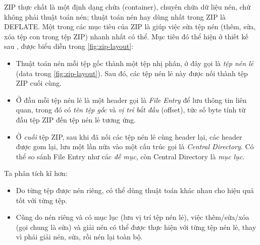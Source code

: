 \documentclass[../../thesis]{subfiles}
\begin{document}
ZIP thực chất là một định dạng chứa (container), chuyên chứa dữ liệu nén, chứ
không phải thuật toán nén; thuật toán nén hay dùng nhất trong ZIP là DEFLATE.
Một trong các mục tiêu của ZIP là giúp việc sửa tệp nén (thêm, sửa, xóa tệp con
trong tệp ZIP) nhanh nhất có thể. Mục tiêu đó thể hiện ở thiết kế sau
\cite{PKWARE_APPNOTE}, được biểu diễn trong \autoref{fig:zip-layout}:

\begin{itemize}
    \item
        Thuật toán nén mỗi tệp gốc thành một tệp nhị phân, ở đây gọi là
        \emph{tệp nén lẻ} (data trong \autoref{fig:zip-layout}). Sau đó, các tệp
        nén lẻ này được nối thành tệp ZIP cuối cùng.
    \item
        Ở đầu mỗi tệp nén lẻ là một header gọi là \emph{File Entry} để lưu thông
        tin liên quan, trong đó có \emph{tên tệp gốc} và \emph{vị trí bắt đầu}
        (offset), tức số byte tính từ đầu tệp ZIP đến tệp nén lẻ tương ứng.
    \item
        Ở \emph{cuối} tệp ZIP, sau khi đã nối các tệp nén lẻ cùng header lại,
        các header được gom lại, lưu một lần nữa vào một cấu trúc gọi là
        \emph{Central Directory}. Có thể so sánh File Entry như các \emph{đề
        mục}, còn Central Directory là \emph{mục lục}.
\end{itemize}

Ta phân tích kĩ hơn:

\begin{itemize}
    \item
        Do từng tệp được nén riêng, có thể dùng thuật toán khác nhau cho hiệu
        quả tốt với từng tệp.
    \item
        Cũng do nén riêng và có mục lục (lưu vị trí tệp nén lẻ), việc
        thêm/sửa/xóa (gọi chung là sửa) và giải nén có thể được thực hiện với
        từng tệp nén lẻ, thay vì phải giải nén, sửa, rồi nén lại toàn bộ.
\end{itemize}
\end{document}
